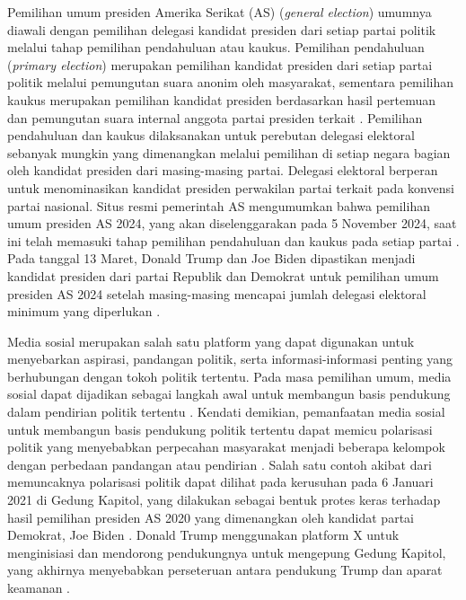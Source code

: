 \documentclass[journal]{IEEEtran}
\begin{document}
Pemilihan umum presiden Amerika Serikat (AS) (\textit{general election}) umumnya diawali dengan pemilihan delegasi kandidat presiden dari setiap partai politik melalui tahap pemilihan pendahuluan atau kaukus. Pemilihan pendahuluan (\textit{primary election}) merupakan pemilihan kandidat presiden dari setiap partai politik melalui pemungutan suara anonim oleh masyarakat, sementara pemilihan kaukus merupakan pemilihan kandidat presiden berdasarkan hasil pertemuan dan pemungutan suara internal anggota partai presiden terkait \cite{jeremias2021primary}. Pemilihan pendahuluan dan kaukus dilaksanakan untuk perebutan delegasi elektoral sebanyak mungkin yang dimenangkan melalui pemilihan di setiap negara bagian oleh kandidat presiden dari masing-masing partai. Delegasi elektoral berperan untuk menominasikan kandidat presiden perwakilan partai terkait pada konvensi partai nasional. Situs resmi pemerintah AS mengumumkan bahwa pemilihan umum presiden AS 2024, yang akan diselenggarakan pada 5 November 2024, saat ini telah memasuki tahap pemilihan pendahuluan dan kaukus pada setiap partai \cite{usagov2024}. Pada tanggal 13 Maret, Donald Trump dan Joe Biden dipastikan menjadi kandidat presiden dari partai Republik dan Demokrat untuk pemilihan umum presiden AS 2024 setelah masing-masing mencapai jumlah delegasi elektoral minimum yang diperlukan \cite{abcnews2024}.

Media sosial merupakan salah satu platform yang dapat digunakan untuk menyebarkan aspirasi, pandangan politik, serta informasi-informasi penting yang berhubungan dengan tokoh politik tertentu. Pada masa pemilihan umum, media sosial dapat dijadikan sebagai langkah awal untuk membangun basis pendukung dalam pendirian politik tertentu \cite{rajab2017social}. Kendati demikian, pemanfaatan media sosial untuk membangun basis pendukung politik tertentu dapat memicu polarisasi politik yang menyebabkan perpecahan masyarakat menjadi beberapa kelompok dengan perbedaan pandangan atau pendirian \cite{garcia2015ideological}. Salah satu contoh akibat dari memuncaknya polarisasi politik dapat dilihat pada kerusuhan pada 6 Januari 2021 di Gedung Kapitol, yang dilakukan sebagai bentuk protes keras terhadap hasil pemilihan presiden AS 2020 yang dimenangkan oleh kandidat partai Demokrat, Joe Biden \cite{jost2022cognitive}. Donald Trump menggunakan platform X untuk menginisiasi dan mendorong pendukungnya untuk mengepung Gedung Kapitol, yang akhirnya menyebabkan perseteruan antara pendukung Trump dan aparat keamanan \cite{bizel2023political}.
\end{document}
